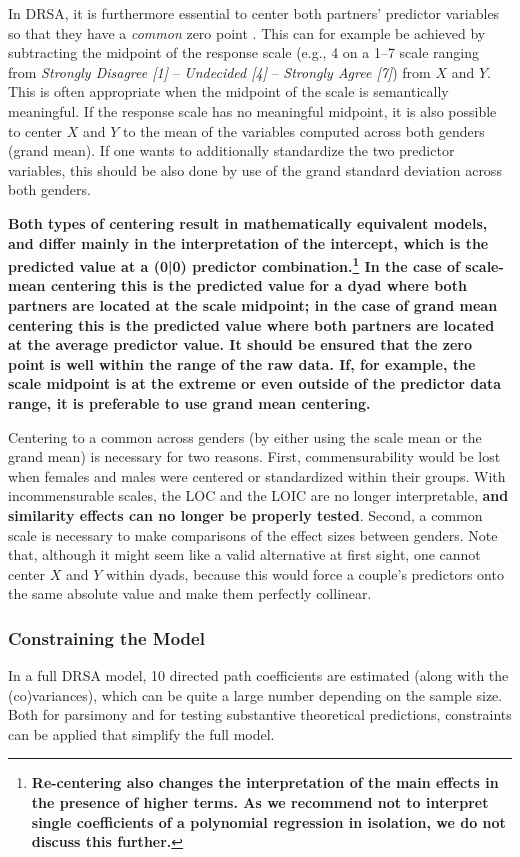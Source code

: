 \documentclass[jou,a4paper,draftfirst]{apa6}
\newcommand{\added}[1]{\textcolor{colour_added}{\bf{#1}}}
\begin{document}
In DRSA, it is furthermore essential to center both partners' predictor variables so that they have a \textit{common} zero point \parencite{kenny_partner_1999,kenny_dyadic_2006}. This can for example be achieved by subtracting the midpoint of the response scale (e.g., 4 on a 1--7 scale ranging from \textit{Strongly Disagree [1]} -- \textit{Undecided [4]} -- \textit{Strongly Agree [7]}) from $X$ and $Y$. This is often appropriate when the midpoint of the scale is semantically meaningful. If the response scale has no meaningful midpoint, it is also possible to center $X$ and $Y$ to the mean of the variables computed across both genders (grand mean). If one wants to additionally standardize the two predictor variables, this should be also done by use of the grand standard deviation across both genders. 

\added{Both types of centering result in mathematically equivalent models, and differ mainly in the interpretation of the intercept, which is the predicted value at a (0|0) predictor combination.\footnote{\added{Re-centering also changes the interpretation of the main effects in the presence of higher terms. As we recommend not to interpret single coefficients of a polynomial regression in isolation, we do not discuss this further.}} In the case of scale-mean centering this is the predicted value for a dyad where both partners are located at the scale midpoint; in the case of grand mean centering this is the predicted value where both partners are located at the average predictor value. It should be ensured that the zero point is well within the range of the raw data. If, for example, the scale midpoint is at the extreme or even outside of the predictor data range, it is preferable to use grand mean centering.}

Centering to a common across genders (by either using the scale mean or the grand mean) is necessary for two reasons. First, commensurability would be lost when females and males were centered or standardized within their groups. With incommensurable scales, the LOC and the LOIC are no longer interpretable, \added{and similarity effects can no longer be properly tested}. Second, a common scale is necessary to make comparisons of the effect sizes between genders. Note that, although it might seem like a valid alternative at first sight, one cannot center $X$ and $Y$ within dyads, because this would force a couple’s predictors onto the same absolute value and make them perfectly collinear.

\subsubsection{Constraining the Model}
In a full DRSA model, 10 directed path coefficients are estimated (along with the (co)variances), which can be quite a large number depending on the sample size. Both for parsimony and for testing substantive theoretical predictions, constraints can be applied that simplify the full model.
\end{document}
